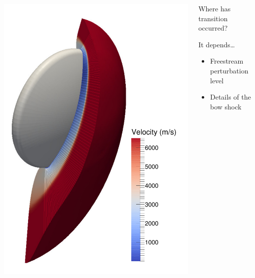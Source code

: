 \documentclass[mathserif]{beamer}
\begin{document}
\begin{frame}{}
\begin{columns}
  \begin{column}{0.30\textwidth}
    \includegraphics[width=\textwidth]{symplanenorm}
  \end{column}
  \begin{column}{0.75\textwidth}
  \begin{description}[Q]
    \item[Q] Where has transition occurred?
    \item[A] It depends\dots
      \begin{itemize}
        \item Freestream perturbation level
        \item Details of the bow shock

\end{itemize}
\end{description}
\end{column}
\end{columns}
\end{frame}
\end{document}
